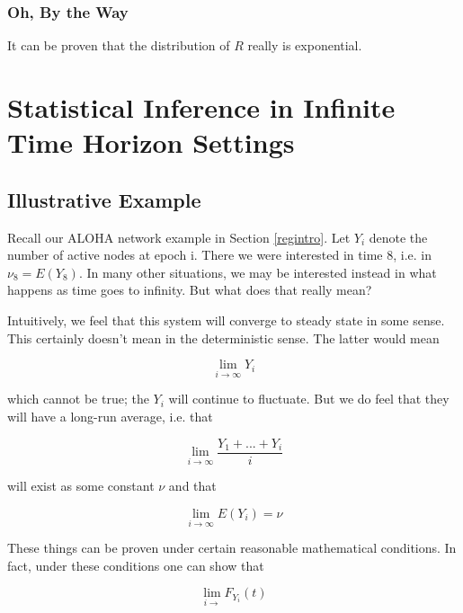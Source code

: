 \subsubsection{Oh, By the Way}

It can be proven that the distribution of $R$ really is exponential.

\section{Statistical Inference in Infinite Time Horizon Settings}

\subsection{Illustrative Example}

Recall our ALOHA network example in Section \ref{regintro}.  Let $Y_i$
denote the number of active nodes at epoch i.  There we were interested
in time 8, i.e. in $\nu_8 = E(Y_8)$.  In many other situations, we may
be interested instead in what happens as time goes to infinity.  But
what does that really mean?

Intuitively, we feel that this system will converge to steady state in
some sense.  This certainly doesn't mean in the deterministic sense.
The latter would mean

\begin{equation}
\lim_{i \rightarrow \infty} Y_i
\end{equation}

which cannot be true; the $Y_i$ will continue to fluctuate.  But we do
feel that they will have a long-run average, i.e. that

\begin{equation}
\label{cesaro}
\lim_{i \rightarrow \infty} \frac{Y_1+...+Y_i}{i}
\end{equation}

will exist as some constant $\nu$ and that 

\begin{equation}
\label{nulim}
\lim_{i \rightarrow \infty} E(Y_i) = \nu
\end{equation}

These things can be proven under certain reasonable mathematical
conditions.  In fact, under these conditions one can show that 

\begin{equation}
\lim_{i \rightarrow} F_{Y_i}(t)
\end{equation}

